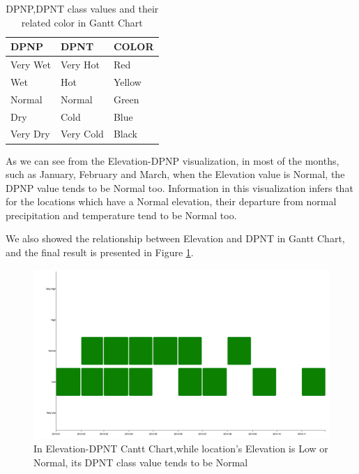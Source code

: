 \documentclass[11pt]{article}
\begin{document}
\begin{table}
\centering
\begin{tabularx}{\textwidth}{|X|X|X|}
  \hline
  \textbf{DPNP} & \textbf{DPNT} & \textbf{COLOR}\\
  \hline\hline
  Very Wet & Very Hot & Red\\
  \hline
  Wet & Hot & Yellow\\
  \hline
  Normal & Normal & Green\\
  \hline
  Dry & Cold & Blue \\
  \hline
  Very Dry & Very Cold & Black \\
  \hline

\end{tabularx}
\caption{DPNP,DPNT class values and their related color in Gantt Chart}
                \label{table:DPNP-DPNT-COLOR}
                \end{table}
%

As we can see from the Elevation-DPNP visualization, in most of the months, such as January, February and March, when the Elevation value is Normal, the DPNP value tends to be Normal too. Information in this visualization infers that for the locations which have a Normal elevation, their departure from normal precipitation and temperature tend to be Normal too.

We also showed the relationship between Elevation and DPNT in Gantt Chart, and the final result is presented in Figure \ref{fig:Gantt Chart for DPNT}.

\begin{figure}
  \centering
  \includegraphics[width=\textwidth]{fig/ganttchart-dpnt.png}
  \caption{In Elevation-DPNT Cantt Chart,while location's Elevation is Low or Normal, its DPNT class value tends to be Normal}
  \label{fig:Gantt Chart for DPNT}
  \vspace{-0.1 in}
\end{figure}
\end{document}
